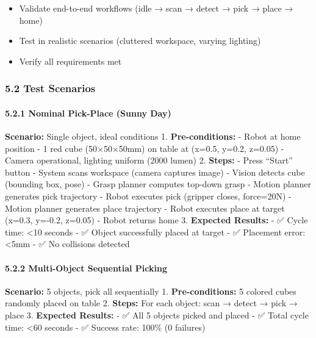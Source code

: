 \documentclass[
]{article}
\providecommand{\tightlist}{%
  \setlength{\itemsep}{0pt}\setlength{\parskip}{0pt}}
\begin{document}
\begin{itemize}
\tightlist
\item
  Validate end-to-end workflows (idle → scan → detect → pick → place →
  home)
\item
  Test in realistic scenarios (cluttered workspace, varying lighting)
\item
  Verify all requirements met
\end{itemize}

\hypertarget{test-scenarios}{%
\subsubsection{5.2 Test Scenarios}\label{test-scenarios}}

\hypertarget{nominal-pick-place-sunny-day}{%
\paragraph{5.2.1 Nominal Pick-Place (Sunny
Day)}\label{nominal-pick-place-sunny-day}}

\textbf{Scenario:} Single object, ideal conditions 1.
\textbf{Pre-conditions:} - Robot at home position - 1 red cube
(50×50×50mm) on table at (x=0.5, y=0.2, z=0.05) - Camera operational,
lighting uniform (2000 lumen) 2. \textbf{Steps:} - Press ``Start''
button - System scans workspace (camera captures image) - Vision detects
cube (bounding box, pose) - Grasp planner computes top-down grasp -
Motion planner generates pick trajectory - Robot executes pick (gripper
closes, force=20N) - Motion planner generates place trajectory - Robot
executes place at target (x=0.3, y=-0.2, z=0.05) - Robot returns home 3.
\textbf{Expected Results:} - ✅ Cycle time: \textless10 seconds - ✅
Object successfully placed at target - ✅ Placement error: \textless5mm
- ✅ No collisions detected

\hypertarget{multi-object-sequential-picking}{%
\paragraph{5.2.2 Multi-Object Sequential
Picking}\label{multi-object-sequential-picking}}

\textbf{Scenario:} 5 objects, pick all sequentially 1.
\textbf{Pre-conditions:} 5 colored cubes randomly placed on table 2.
\textbf{Steps:} For each object: scan → detect → pick → place 3.
\textbf{Expected Results:} - ✅ All 5 objects picked and placed - ✅
Total cycle time: \textless60 seconds - ✅ Success rate: 100\% (0
failures)
\end{document}
